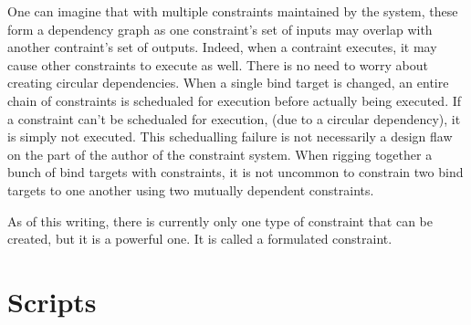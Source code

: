 \documentclass[12pt]{article}
\begin{document}
One can imagine that with multiple constraints maintained by the system, these
form a dependency graph as one constraint's set of inputs may overlap with
another contraint's set of outputs.  Indeed, when a contraint executes, it may
cause other constraints to execute as well.  There is no need to worry about
creating circular dependencies.  When a single bind target is changed, an entire
chain of constraints is schedualed for execution before actually being executed.
If a constraint can't be schedualed for execution, (due to a circular dependency), it is simply not
executed.  This schedualling failure is not necessarily a design flaw on the part
of the author of the constraint system.  When rigging together a bunch of bind
targets with constraints, it is not uncommon to constrain two bind targets to
one another using two mutually dependent constraints.

As of this writing, there is currently only one type of constraint that can be
created, but it is a powerful one.  It is called a formulated constraint.

\section{Scripts}
\end{document}
